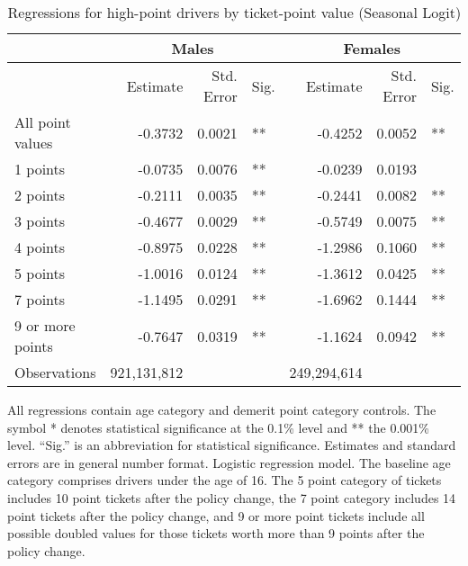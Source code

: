 
\begin{table}%
\centering 
\begin{tabular}{l r r l r r l} 

\hline 
 
 & \multicolumn{3}{c}{Males} & \multicolumn{3}{c}{Females} \\ 

\hline 
 
 & Estimate & Std. Error & Sig. & Estimate & Std. Error & Sig. \\ 

\hline 
 
All point values                &  -0.3732        &  0.0021       &   **       &  -0.4252        &  0.0052       &   **       \\ 
1 points                        &  -0.0735        &  0.0076       &   **       &  -0.0239        &  0.0193       &            \\ 
2 points                        &  -0.2111        &  0.0035       &   **       &  -0.2441        &  0.0082       &   **       \\ 
3 points                        &  -0.4677        &  0.0029       &   **       &  -0.5749        &  0.0075       &   **       \\ 
4 points                        &  -0.8975        &  0.0228       &   **       &  -1.2986        &  0.1060       &   **       \\ 
5 points                        &  -1.0016        &  0.0124       &   **       &  -1.3612        &  0.0425       &   **       \\ 
7 points                        &  -1.1495        &  0.0291       &   **       &  -1.6962        &  0.1444       &   **       \\ 
9 or more points                &  -0.7647        &  0.0319       &   **       &  -1.1624        &  0.0942       &   **       \\ 
Observations            & 921,131,812    &          &              &  249,294,614 \\ 


\hline 

\end{tabular} 
\caption{Regressions for high-point drivers by ticket-point value (Seasonal Logit)} 
All regressions contain age category and demerit point category controls. 
The symbol * denotes statistical significance at the 0.1\% level 
and ** the 0.001\% level. 
``Sig.'' is an abbreviation for statistical significance. 
Estimates and standard errors are in general number format. 
Logistic regression model. 
The baseline age category comprises drivers under the age of 16. 
The 5 point category of tickets includes 10 point tickets after the policy change,  
the 7 point category includes 14 point tickets after the policy change,  
and 9 or more point tickets include all possible doubled values for those tickets  
worth more than 9 points after the policy change. 
\label{tab:seas_logit_regs_by_points} 
\end{table} 
 
